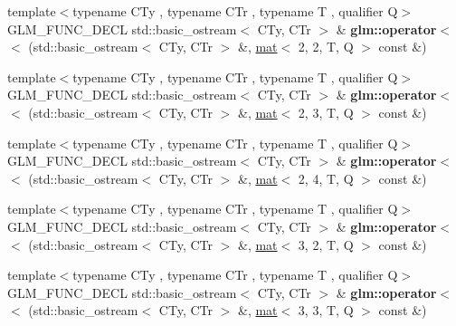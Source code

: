 \begin{DoxyCompactItemize}
\item 
\mbox{\label{group__gtx__io_ga9793fc7111cd7d145c369827071f5091}} 
{\footnotesize template$<$typename C\+Ty , typename C\+Tr , typename T , qualifier Q$>$ }\\G\+L\+M\+\_\+\+F\+U\+N\+C\+\_\+\+D\+E\+CL std\+::basic\+\_\+ostream$<$ C\+Ty, C\+Tr $>$ \& {\bfseries glm\+::operator$<$$<$} (std\+::basic\+\_\+ostream$<$ C\+Ty, C\+Tr $>$ \&, \hyperlink{structglm_1_1mat}{mat}$<$ 2, 2, T, Q $>$ const \&)
\item 
\mbox{\label{group__gtx__io_ga2bf4942715dc303be4a8752a44adce55}} 
{\footnotesize template$<$typename C\+Ty , typename C\+Tr , typename T , qualifier Q$>$ }\\G\+L\+M\+\_\+\+F\+U\+N\+C\+\_\+\+D\+E\+CL std\+::basic\+\_\+ostream$<$ C\+Ty, C\+Tr $>$ \& {\bfseries glm\+::operator$<$$<$} (std\+::basic\+\_\+ostream$<$ C\+Ty, C\+Tr $>$ \&, \hyperlink{structglm_1_1mat}{mat}$<$ 2, 3, T, Q $>$ const \&)
\item 
\mbox{\label{group__gtx__io_ga79ad9284d3311aad760f84621197c972}} 
{\footnotesize template$<$typename C\+Ty , typename C\+Tr , typename T , qualifier Q$>$ }\\G\+L\+M\+\_\+\+F\+U\+N\+C\+\_\+\+D\+E\+CL std\+::basic\+\_\+ostream$<$ C\+Ty, C\+Tr $>$ \& {\bfseries glm\+::operator$<$$<$} (std\+::basic\+\_\+ostream$<$ C\+Ty, C\+Tr $>$ \&, \hyperlink{structglm_1_1mat}{mat}$<$ 2, 4, T, Q $>$ const \&)
\item 
\mbox{\label{group__gtx__io_gacd6666708d198e61ac99b5b144aafdf1}} 
{\footnotesize template$<$typename C\+Ty , typename C\+Tr , typename T , qualifier Q$>$ }\\G\+L\+M\+\_\+\+F\+U\+N\+C\+\_\+\+D\+E\+CL std\+::basic\+\_\+ostream$<$ C\+Ty, C\+Tr $>$ \& {\bfseries glm\+::operator$<$$<$} (std\+::basic\+\_\+ostream$<$ C\+Ty, C\+Tr $>$ \&, \hyperlink{structglm_1_1mat}{mat}$<$ 3, 2, T, Q $>$ const \&)
\item 
\mbox{\label{group__gtx__io_ga4de3d5bb444fa0ef69608fc068e27d0e}} 
{\footnotesize template$<$typename C\+Ty , typename C\+Tr , typename T , qualifier Q$>$ }\\G\+L\+M\+\_\+\+F\+U\+N\+C\+\_\+\+D\+E\+CL std\+::basic\+\_\+ostream$<$ C\+Ty, C\+Tr $>$ \& {\bfseries glm\+::operator$<$$<$} (std\+::basic\+\_\+ostream$<$ C\+Ty, C\+Tr $>$ \&, \hyperlink{structglm_1_1mat}{mat}$<$ 3, 3, T, Q $>$ const \&)

\end{DoxyCompactItemize}
